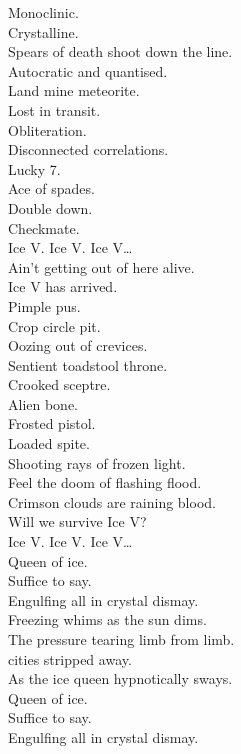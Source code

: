 Monoclinic. \\
Crystalline. \\
Spears of death shoot down the line. \\
Autocratic and quantised. \\
Land mine meteorite. \\
Lost in transit. \\
Obliteration. \\
Disconnected correlations. \\
Lucky 7. \\
Ace of spades. \\
Double down. \\
Checkmate. \\

Ice V. Ice V. Ice V… \\

Ain't getting out of here alive. \\
Ice V has arrived. \\

Pimple pus. \\
Crop circle pit. \\
Oozing out of crevices. \\
Sentient toadstool throne. \\
Crooked sceptre. \\
Alien bone. \\
Frosted pistol. \\
Loaded spite. \\
Shooting rays of frozen light. \\
Feel the doom of flashing flood. \\
Crimson clouds are raining blood. \\

Will we survive Ice V? \\

Ice V. Ice V. Ice V… \\

Queen of ice. \\
Suffice to say. \\
Engulfing all in crystal dismay. \\
Freezing whims as the sun dims. \\
The pressure tearing limb from limb. \\
 cities stripped away. \\
As the ice queen hypnotically sways. \\
Queen of ice. \\
Suffice to say. \\
Engulfing all in crystal dismay. \\

